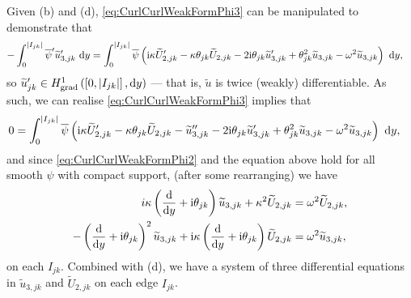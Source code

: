 Given (b) and (d), \eqref{eq:CurlCurlWeakFormPhi3} can be manipulated to demonstrate that
\begin{align*}
	-\int_0^{\left\lvert I_{jk} \right\rvert} \overline{\psi}' \widetilde{u}'_{3,jk} \ \mathrm{d} y
	&= \int_0^{\left\lvert I_{jk} \right\rvert} \overline{\psi} \left(  \mathrm{i}\kappa\widetilde{U}'_{2,jk} - \kappa\theta_{jk}\widetilde{U}_{2,jk} - 2\mathrm{i}\theta_{jk}\widetilde{u}'_{3,jk} + \theta_{jk}^2\widetilde{u}_{3,jk} - \omega^2\widetilde{u}_{3,jk}  \right) \ \mathrm{d} y,
\end{align*}
so $\widetilde{u}'_{jk}\in H^1_\mathrm{grad}\left( \left[ 0,\left\lvert I_{jk} \right\rvert \right], \mathrm{d}y \right)$ --- that is, $\widetilde{u}$ is twice (weakly) differentiable.
As such, we can realise \eqref{eq:CurlCurlWeakFormPhi3} implies that
\begin{align*}
	0 &= \int_0^{\left\lvert I_{jk} \right\rvert} \overline{\psi} \left(  \mathrm{i}\kappa\widetilde{U}'_{2,jk} - \kappa\theta_{jk}\widetilde{U}_{2,jk} - \widetilde{u}''_{3,jk} - 2\mathrm{i}\theta_{jk}\widetilde{u}'_{3,jk} + \theta_{jk}^2\widetilde{u}_{3,jk} - \omega^2\widetilde{u}_{3,jk}  \right) \ \mathrm{d} y,
\end{align*}
and since \eqref{eq:CurlCurlWeakFormPhi2} and the equation above hold for all smooth $\psi$ with compact support, (after some rearranging) we have
\begin{subequations}
	\begin{align}
		i\kappa \left(  \dfrac{\mathrm{d}}{\mathrm{d}y} + \mathrm{i}\theta_{jk}  \right)\widetilde{u}_{3,jk} + \kappa^2\widetilde{U}_{2,jk} &= \omega^2\widetilde{U}_{2,jk}, \label{eq:QGPhi2Standalone} \\
		-\left(  \dfrac{\mathrm{d}}{\mathrm{d}y} + \mathrm{i}\theta_{jk}  \right)^2\widetilde{u}_{3,jk} + \mathrm{i}\kappa\left(  \dfrac{\mathrm{d}}{\mathrm{d}y} + \mathrm{i}\theta_{jk}  \right)\widetilde{U}_{2,jk} &= \omega^2 \widetilde{u}_{3,jk}, \label{eq:QGPhi3Standalone}
	\end{align}
\end{subequations}
on each $I_{jk}$.
Combined with (d), we have a system of three differential equations in $\widetilde{u}_{3,jk}$ and $\widetilde{U}_{2,jk}$ on each edge $I_{jk}$.

